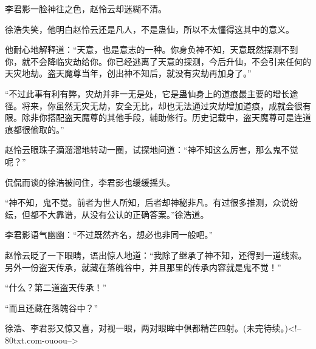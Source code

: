 \begin{this_body}
李君影一脸神往之色，赵怜云却迷糊不清。

徐浩失笑，他明白赵怜云还是凡人，不是蛊仙，所以不太懂得这其中的意义。

他耐心地解释道：“天意，也是意志的一种。你身负神不知，天意既然探测不到你，就不会降临灾劫给你。你已经逃离了天意的探测，今后升仙，不会引来任何的天灾地劫。盗天魔尊当年，创出神不知后，就没有灾劫再加身了。”

“不过此事有利有弊，灾劫并非一无是处，它是蛊仙身上的道痕最主要的增长途径。将来，你虽然无灾无劫，安全无比，却也无法通过灾劫增加道痕，成就会很有限。除非你搭配盗天魔尊的其他手段，辅助修行。历史记载中，盗天魔尊可是连道痕都很偷取的。”

赵怜云眼珠子滴溜溜地转动一圈，试探地问道：“神不知这么厉害，那么鬼不觉呢？”

侃侃而谈的徐浩被问住，李君影也缓缓摇头。

“神不知，鬼不觉。前者为世人所知，后者却神秘非凡。有过很多推测，众说纷纭，但都不大靠谱，从没有公认的正确答案。”徐浩道。

李君影语气幽幽：“不过既然齐名，想必也非同一般吧。”

赵怜云眨了一下眼睛，语出惊人地道：“我除了继承了神不知，还得到一道线索。另外一份盗天传承，就藏在落魄谷中，并且那里的传承内容就是鬼不觉！”

“什么？第二道盗天传承！”

“而且还藏在落魄谷中？”

徐浩、李君影又惊又喜，对视一眼，两对眼眸中俱都精芒四射。(未完待续。)<!--80txt.com-ouoou-->

\end{this_body}

